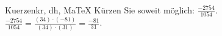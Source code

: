 \begin{MAufgabe}{Kuerzen}{kr, dh, MaTeX}
K\"urzen Sie soweit m\"oglich: $\frac{-2754}{1054}$.\\ 
\ifLsg\MLoesung
\quad $\frac{-2754}{1054}=\frac{(34)\cdot(-81)}{(34)\cdot(31)}=\frac{-81}{31}$.\else\relax\fi
 \end{MAufgabe}